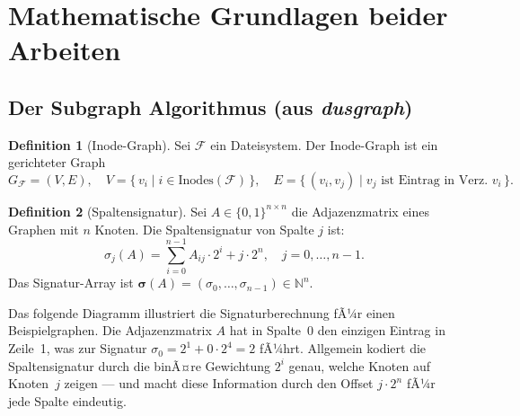 ﻿\documentclass[a4paper,12pt]{article}
\theoremstyle{definition}
\newtheorem{definition}{Definition}[section]
\theoremstyle{plain}
\begin{document}
\section{Mathematische Grundlagen beider Arbeiten}
\label{sec:grundlagen}

\subsection{Der Subgraph Algorithmus (aus \texorpdfstring{\textit{dusgraph}}{dusgraph})}
\label{ssec:subgraph_algo}

\begin{definition}[Inode-Graph]
\label{def:inode_graph}
  Sei $\mathcal{F}$ ein Dateisystem.  Der Inode-Graph ist ein gerichteter
  Graph
  \[
    G_\mathcal{F} = (V, E),
    \quad
    V = \{\,v_i \mid i \in \mathrm{Inodes}(\mathcal{F})\,\},
    \quad
    E = \{\,(v_i, v_j) \mid v_j \text{ ist Eintrag in Verz. } v_i\,\}.
  \]
\end{definition}

\begin{definition}[Spaltensignatur]
\label{def:spalten_sig}
  Sei $A \in \{0,1\}^{n \times n}$ die Adjazenzmatrix eines Graphen
  mit $n$ Knoten.  Die Spaltensignatur von Spalte $j$ ist:
  \[
    \sigma_j(A) = \sum_{i=0}^{n-1} A_{ij} \cdot 2^i + j \cdot 2^n,
    \quad j = 0, \ldots, n-1.
  \]
  Das Signatur-Array ist $\boldsymbol{\sigma}(A) = (\sigma_0, \ldots,
  \sigma_{n-1}) \in \mathbb{N}^n$.
\end{definition}

Das folgende Diagramm illustriert die Signaturberechnung fÃ¼r einen
Beispielgraphen.  Die Adjazenzmatrix $A$ hat in Spalte~0 den einzigen
Eintrag in Zeile~1, was zur Signatur $\sigma_0 = 2^1 + 0 \cdot 2^4 = 2$
fÃ¼hrt.  Allgemein kodiert die Spaltensignatur durch die binÃ¤re Gewichtung
$2^i$ genau, welche Knoten auf Knoten~$j$ zeigen --- und macht diese
Information durch den Offset $j \cdot 2^n$ fÃ¼r jede Spalte eindeutig.
\end{document}
